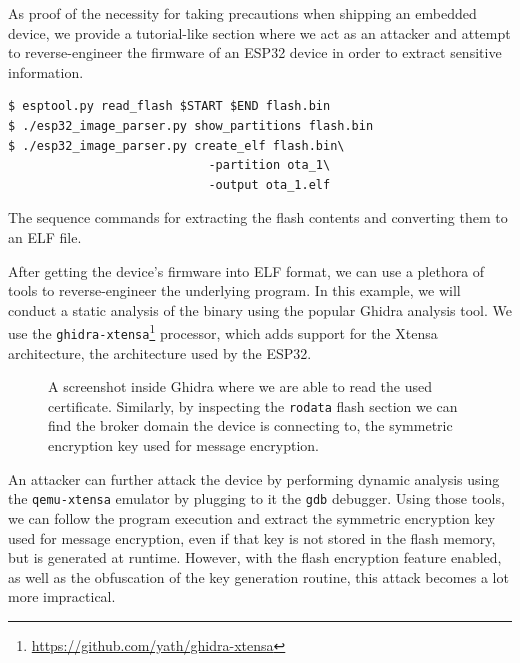 \documentclass[conference]{IEEEtran}
\begin{document}
As proof of the necessity for taking precautions when shipping an embedded device, 
we provide a tutorial-like section where we act as an attacker and attempt to reverse-engineer the firmware of an ESP32
device in order to extract sensitive information.

\begin{listing}[h]
\begin{verbatim}
$ esptool.py read_flash $START $END flash.bin
$ ./esp32_image_parser.py show_partitions flash.bin
$ ./esp32_image_parser.py create_elf flash.bin\
                            -partition ota_1\
                            -output ota_1.elf
\end{verbatim}
\caption{The sequence commands for extracting the flash contents and converting them to an ELF file.}
\end{listing}

After getting the device's firmware into ELF format, we can use a plethora of tools 
to reverse-engineer the underlying program. 
In this example, we will conduct a static analysis of the binary using the popular Ghidra\cite{Ghidra, GhidraBook} analysis tool.
We use the \texttt{ghidra-xtensa}\footnote{\url{https://github.com/yath/ghidra-xtensa}} processor,
which adds support for the Xtensa architecture, the architecture used by the ESP32.

\begin{figure}[h]
    \centering
    \caption{A screenshot inside Ghidra where we are able to read the used certificate. Similarly, 
    by inspecting the \texttt{rodata} flash section we can find the broker domain the device is connecting to, the 
    symmetric encryption key used for message encryption.}
    \label{fig:ghidra}
\end{figure}

An attacker can further attack the device by performing dynamic analysis using the \texttt{qemu-xtensa} emulator
by plugging to it the \texttt{gdb} debugger. 
Using those tools, we can follow the program execution and extract the symmetric encryption key used for message encryption, 
even if that key is not stored in the flash memory, but is generated at runtime.
However, with the flash encryption feature enabled, as well as the obfuscation of the key generation routine,
this attack becomes a lot more impractical.
\end{document}
